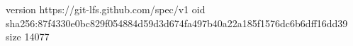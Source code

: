 version https://git-lfs.github.com/spec/v1
oid sha256:87f4330e0bc829f054884d59d3d674fa497b40a22a185f1576dc6b6dff16dd39
size 14077
